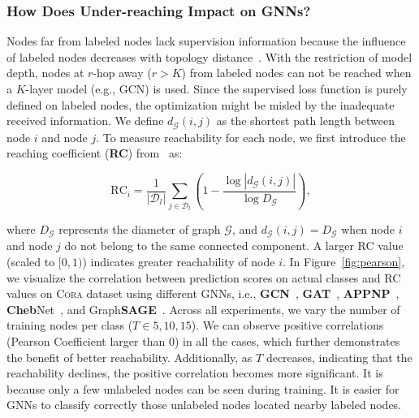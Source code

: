 \documentclass[letterpaper]{article} %
\newcommand{\labeledset}{\mathcal{D}_{l}}
\begin{document}
\subsubsection{How Does Under-reaching Impact on GNNs?}
Nodes far from labeled nodes lack supervision information because the influence of labeled nodes decreases with topology distance~\cite{influence_decay}. With the restriction of model depth, nodes at $r$-hop away ($r > K$) from labeled nodes can not be reached when a $K$-layer model (e.g., GCN) is used. Since the supervised loss function is purely defined on labeled nodes, the optimization might be misled by the inadequate received information. We define $ d_{\mathcal{G}}(i,j)$ as the shortest path length between node $i$ and node $j$. To measure reachability for each node, we first introduce the reaching coefficient (\textbf{RC}) from~\cite{pastel} as:
\begin{small}
\begin{equation}
\label{eq:rc}
	\text{RC}_{i} = \frac{1}{|\labeledset|} \sum_{j \in \labeledset} \left( 1 - \frac{\log |d_{\mathcal{G}}(i,j)|}{\log D_{\mathcal{G}}} \right),
\end{equation}	
\end{small}where $D_{\mathcal{G}}$ represents the diameter of graph $\mathcal{G}$, and $d_{\mathcal{G}}(i,j) = D_{\mathcal{G}}$ when node $i$ and node $j$ do not belong to the same connected component. A larger RC value (scaled to $[0,1)$) indicates greater reachability of node $i$. In Figure~\ref{fig:pearson}, we visualize the correlation between prediction scores on actual classes and RC values on \textsc{Cora} dataset using different GNNs, i.e., \textbf{GCN}~\cite{gcn}, \textbf{GAT}~\cite{gat}, \textbf{APPNP}~\cite{appnp}, \textbf{Cheb}Net~\cite{chebnet}, and Graph\textbf{SAGE}~\cite{sage}. Across all experiments, we vary the number of training nodes per class ($T \in {5, 10, 15}$). We can observe positive correlations (Pearson Coefficient larger than 0) in all the cases, which further demonstrates the benefit of better reachability. Additionally, as $T$ decreases, indicating that the reachability declines, the positive correlation becomes more significant. It is because only a few unlabeled nodes can be seen during training. It is easier for GNNs to classify correctly those unlabeled nodes located nearby labeled nodes.
 
\end{document}
